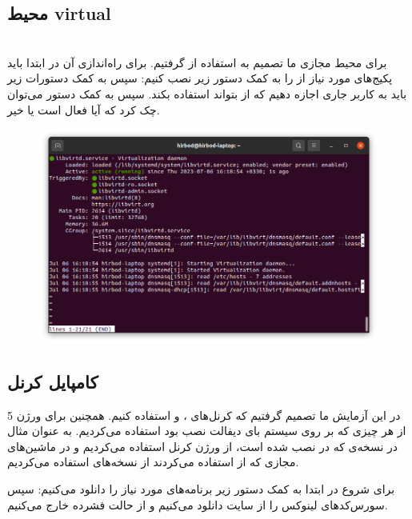 \subsection{محیط‌ virtual}
\\
برای محیط مجازی ما تصمیم به استفاده از
گرفتیم. برای راه‌اندازی آن در ابتدا باید پکیج‌های مورد نیاز از
را به کمک دستور زیر نصب کنیم:
سپس به کمک دستورات زیر باید به کاربر جاری اجازه دهیم که از
بتواند استفاده بکند.
سپس به کمک دستور
می‌توان چک کرد که آیا
فعال است یا خیر.
\begin{figure}[H]
    \centering
    \includegraphics[scale=0.3]{pictures/intro/kvm.png}
    \caption{}
    \label{fig:into:kvm}
\end{figure}

\subsection{کامپایل کرنل}
در این آزمایش ما تصمیم گرفتیم که کرنل‌های
،  و 
استفاده کنیم. همچنین برای ورژن 5 از هر چیزی که بر روی سیستم بای دیفالت نصب بود استفاده می‌کردیم.
به عنوان مثال در نسخه‌ی
که در
نصب شده است، از ورژن کرنل
استفاده می‌کردیم و در ماشین‌های مجازی که از
استفاده می‌کردند از نسخه‌های
استفاده می‌کردیم.

برای شروع در ابتدا به کمک دستور زیر برنامه‌های مورد نیاز را دانلود می‌کنیم:
سپس سورس‌کد‌های لینوکس را از سایت
دانلود می‌کنیم و از حالت فشرده خارج می‌کنیم.

